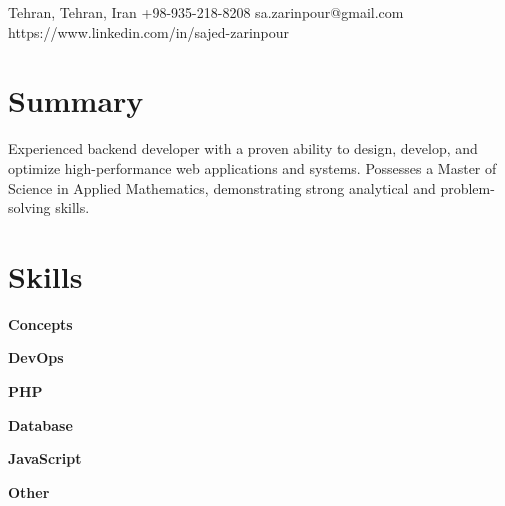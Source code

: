 \documentclass[10pt, a4paper]{article}
\begin{document}
	
	\contactInfo
	{Tehran, Tehran, Iran}
	{+98-935-218-8208}
	{sa.zarinpour@gmail.com}
	{https://www.linkedin.com/in/sajed-zarinpour}
	\section*{Summary}
	Experienced backend developer with a proven ability to design, develop, and optimize high-performance web applications and systems. Possesses a Master of Science in Applied Mathematics, demonstrating strong analytical and problem-solving skills. 
	
	\section*{Skills}
	
	\textbf{Concepts}\hspace{0.5em} 
	
	\textbf{DevOps} \hspace{0.8em} 
	
	\textbf{PHP}\hspace{2.85em}
	
	\textbf{Database}\hspace{0.8em}
	
	\textbf{JavaScript}\hspace{0.3em}
	
	\textbf{Other}\hspace{2.4em}
	
\end{document}
